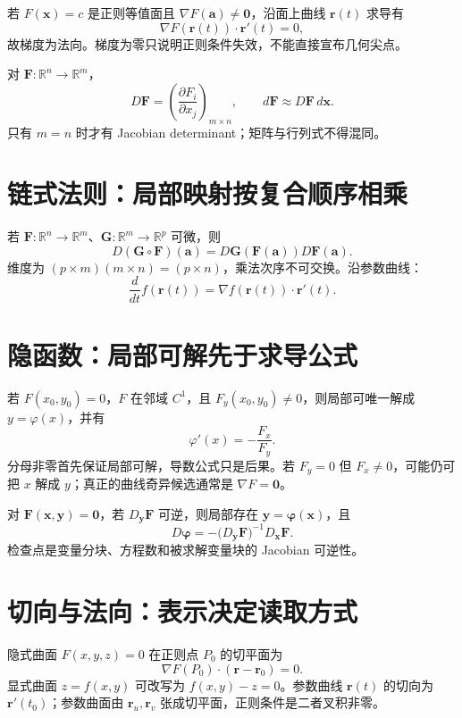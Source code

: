\documentclass[11pt,a4paper,fontset=fandol]{ctexart}
\begin{document}
若 $F(\mathbf x)=c$ 是正则等值面且 $\nabla F(\mathbf a)\ne\mathbf0$，沿面上曲线 $\mathbf r(t)$ 求导有
\[
\nabla F(\mathbf r(t))\cdot\mathbf r'(t)=0,
\]
故梯度为法向。梯度为零只说明正则条件失效，不能直接宣布几何尖点。

对 $\mathbf F:\mathbb R^n\to\mathbb R^m$，
\[
D\mathbf F={\left(\frac{\partial F_i}{\partial x_j}\right)}_{m\times n},
\qquad d\mathbf F\approx D\mathbf F\,d\mathbf x.
\]
只有 $m=n$ 时才有 Jacobian determinant；矩阵与行列式不得混同。

\section{链式法则：局部映射按复合顺序相乘}

若 $\mathbf F:\mathbb R^n\to\mathbb R^m$、$\mathbf G:\mathbb R^m\to\mathbb R^p$ 可微，则
\[
\boxed{D(\mathbf G\circ\mathbf F)(\mathbf a)
=D\mathbf G(\mathbf F(\mathbf a))D\mathbf F(\mathbf a)}.
\]
维度为 $(p\times m)(m\times n)=(p\times n)$，乘法次序不可交换。沿参数曲线：
\[
\frac d{dt}f(\mathbf r(t))=\nabla f(\mathbf r(t))\cdot\mathbf r'(t).
\]

\section{隐函数：局部可解先于求导公式}

若 $F(x_0,y_0)=0$，$F$ 在邻域 $C^1$，且 $F_y(x_0,y_0)\ne0$，则局部可唯一解成 $y=\varphi(x)$，并有
\[
\varphi'(x)=-\frac{F_x}{F_y}.
\]
分母非零首先保证局部可解，导数公式只是后果。若 $F_y=0$ 但 $F_x\ne0$，可能仍可把 $x$ 解成 $y$；真正的曲线奇异候选通常是 $\nabla F=\mathbf0$。

对 $\mathbf F(\mathbf x,\mathbf y)=\mathbf0$，若 $D_{\mathbf y}\mathbf F$ 可逆，则局部存在 $\mathbf y=\boldsymbol\varphi(\mathbf x)$，且
\[
D\boldsymbol\varphi
=-{\bigl(D_{\mathbf y}\mathbf F\bigr)}^{-1}D_{\mathbf x}\mathbf F.
\]
检查点是变量分块、方程数和被求解变量块的 Jacobian 可逆性。

\section{切向与法向：表示决定读取方式}

隐式曲面 $F(x,y,z)=0$ 在正则点 $P_0$ 的切平面为
\[
\nabla F(P_0)\cdot(\mathbf r-\mathbf r_0)=0.
\]
显式曲面 $z=f(x,y)$ 可改写为 $f(x,y)-z=0$。参数曲线 $\mathbf r(t)$ 的切向为 $\mathbf r'(t_0)$；参数曲面由 $\mathbf r_u,\mathbf r_v$ 张成切平面，正则条件是二者叉积非零。
\end{document}
